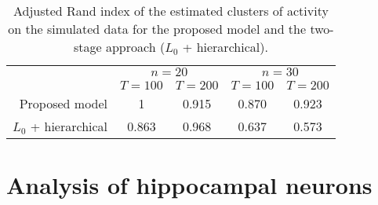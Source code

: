 \begin{table}
	\centering
	\begin{tabular}{r||cc|cc}
								& \multicolumn{2}{c}{$n=20$}	    & \multicolumn{2}{c}{$n=30$} \\
								&  $T=100$ 		  & $T=200$ 		& $T=100$ 		  & $T=200$ \\
								\hline
		Proposed model  		&		1		  &   0.915			&  0.870			  & 0.923		\\
		$L_0$ + hierarchical    &		0.863	  &   0.968			&  0.637			  & 0.573				
	\end{tabular}
\label{ch4:tab_Rand}
\caption[Adjusted Rand index of the estimated clusters of activity on the simulated data.]{Adjusted Rand index of the estimated clusters of activity on the simulated data for the proposed model and the two-stage approach ($L_0$ + hierarchical). }
\end{table}




\section{Analysis of hippocampal neurons}




